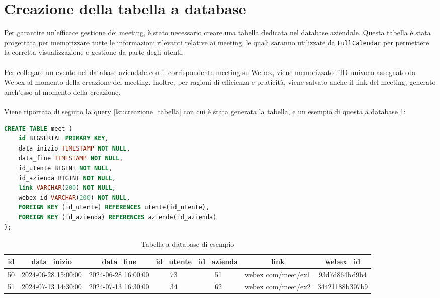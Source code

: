 \section{Creazione della tabella a database}
Per garantire un'efficace gestione dei meeting, è stato necessario creare una tabella dedicata nel database aziendale.
Questa tabella è stata progettata per memorizzare tutte le informazioni rilevanti relative ai meeting, le quali
saranno utilizzate da \texttt{FullCalendar} \cite{FullCalendarSite} per permettere la corretta visualizzazione e gestione 
da parte degli utenti.
\\
\\
Per collegare un evento nel database aziendale con il corrispondente meeting su Webex, viene memorizzato l'ID 
univoco assegnato da Webex al momento della creazione del meeting. Inoltre, per ragioni di efficienza e praticità, 
viene salvato anche il link del meeting, generato anch'esso al momento della creazione.
\\
\\
Viene riportata di seguito la query \ref{lst:creazione_tabella} con cui è stata generata la tabella,
e un esempio di questa a database \ref{tbl:esempio_tabella_database}:
\begin{lstlisting}[language=SQL, frame=lines, caption={query creazione tabella}, label={lst:creazione_tabella}]
CREATE TABLE meet (
    id BIGSERIAL PRIMARY KEY,
    data_inizio TIMESTAMP NOT NULL,
    data_fine TIMESTAMP NOT NULL,
    id_utente BIGINT NOT NULL,
    id_azienda BIGINT NOT NULL,
    link VARCHAR(200) NOT NULL,
    webex_id VARCHAR(200) NOT NULL,
    FOREIGN KEY (id_utente) REFERENCES utente(id_utente),
    FOREIGN KEY (id_azienda) REFERENCES aziende(id_azienda)
);
\end{lstlisting}
\begin{table}[ht]
    \centering
    \begin{adjustbox}{width=13cm, center}
    \begin{tabular}{|c|c|c|c|c|c|c|}
        \hline
        \rowcolor{gray!30}
        id & data\_inizio & data\_fine & id\_utente & id\_azienda & link & webex\_id \\
        \hline
        50 & 2024-06-28 15:00:00 & 2024-06-28 16:00:00 & 73 & 51 & webex.com\//meet\//ex1 & 93d7d864bd9b4 \\
        \hline
        51 & 2024-07-13 14:30:00 & 2024-07-13 16:30:00 & 34 & 62 & webex.com\//meet\//ex2 & 34421188b307b9\\
        \hline
    \end{tabular}
    \end{adjustbox}
    \caption{Tabella a database di esempio}
    \label{tbl:esempio_tabella_database}
\end{table}
